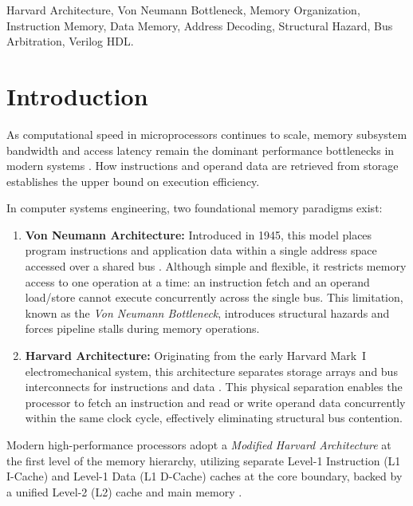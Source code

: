 \documentclass[conference]{IEEEtran}
\begin{document}
\begin{IEEEkeywords}
Harvard Architecture, Von Neumann Bottleneck, Memory Organization, Instruction Memory, Data Memory, Address Decoding, Structural Hazard, Bus Arbitration, Verilog HDL.
\end{IEEEkeywords}

\section{Introduction}
As computational speed in microprocessors continues to scale, memory subsystem bandwidth and access latency remain the dominant performance bottlenecks in modern systems \cite{wulf1995hitting}. How instructions and operand data are retrieved from storage establishes the upper bound on execution efficiency.

In computer systems engineering, two foundational memory paradigms exist:
\begin{enumerate}
    \item \textbf{Von Neumann Architecture:} Introduced in 1945, this model places program instructions and application data within a single address space accessed over a shared bus \cite{vonneumann1945}. Although simple and flexible, it restricts memory access to one operation at a time: an instruction fetch and an operand load/store cannot execute concurrently across the single bus. This limitation, known as the \textit{Von Neumann Bottleneck}, introduces structural hazards and forces pipeline stalls during memory operations.
    \item \textbf{Harvard Architecture:} Originating from the early Harvard Mark~I electromechanical system, this architecture separates storage arrays and bus interconnects for instructions and data \cite{hennessy2019computer}. This physical separation enables the processor to fetch an instruction and read or write operand data concurrently within the same clock cycle, effectively eliminating structural bus contention.
\end{enumerate}

Modern high-performance processors adopt a \textit{Modified Harvard Architecture} at the first level of the memory hierarchy, utilizing separate Level-1 Instruction (L1 I-Cache) and Level-1 Data (L1 D-Cache) caches at the core boundary, backed by a unified Level-2 (L2) cache and main memory \cite{patterson2020computer}.
\end{document}
